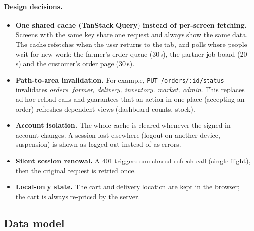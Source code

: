 \documentclass[11pt,a4paper]{article}
\begin{document}
\paragraph{Design decisions.}
\begin{itemize}
  \item \textbf{One shared cache (TanStack Query) instead of per-screen fetching.} Screens with the same key share one request and always show the same data. The cache refetches when the user returns to the tab, and polls where people wait for new work: the farmer's order queue (30\,s), the partner job board (20\,s) and the customer's order page (30\,s).
  \item \textbf{Path-to-area invalidation.} For example, \texttt{PUT /orders/:id/status} invalidates \emph{orders, farmer, delivery, inventory, market, admin}. This replaces ad-hoc reload calls and guarantees that an action in one place (accepting an order) refreshes dependent views (dashboard counts, stock).
  \item \textbf{Account isolation.} The whole cache is cleared whenever the signed-in account changes. A session lost elsewhere (logout on another device, suspension) is shown as logged out instead of as errors.
  \item \textbf{Silent session renewal.} A 401 triggers one shared refresh call (single-flight), then the original request is retried once.
  \item \textbf{Local-only state.} The cart and delivery location are kept in the browser; the cart is always re-priced by the server.
\end{itemize}

\subsection{Data model}
\end{document}
